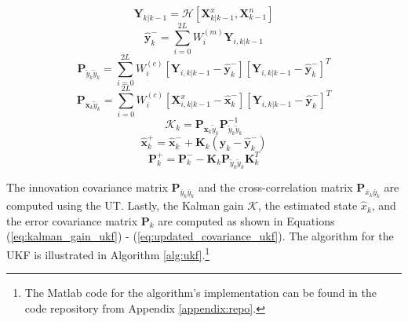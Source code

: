 \begin{equation}
\mathbf{Y}_{k|k-1} = \mathcal{H}\left[\mathbf{X}^x_{k|k-1}, \mathbf{X}^n_{k-1}\right]
\label{eq:predicted_measurement}
\end{equation}
\begin{equation}
\hat{\mathbf{y}}^-_k = \sum_{i=0}^{2L} W^{(m)}_i \mathbf{Y}_{i,k|k-1}
\label{eq:predicted_measurement_estimate}
\end{equation}
\begin{equation}
\mathbf{P}_{\tilde{y}_k\tilde{y}_k} = \sum_{i=0}^{2L} W^{(c)}_i \left[\mathbf{Y}_{i,k|k-1} - \hat{\mathbf{y}}^-_k\right]\left[\mathbf{Y}_{i,k|k-1} - \hat{\mathbf{y}}^-_k\right]^T
\label{eq:innovation_covariance}
\end{equation}
\begin{equation}
\mathbf{P}_{\mathbf{x}_k\tilde{y}_k} = \sum_{i=0}^{2L} W^{(c)}_i \left[\mathbf{X}^x_{i,k|k-1} - \hat{\mathbf{x}}^-_k\right]\left[\mathbf{Y}_{i,k|k-1} - \hat{\mathbf{y}}^-_k\right]^T
\label{eq:cross_covariance}
\end{equation}
\begin{equation}
\mathcal{K}_k = \mathbf{P}_{\mathbf{x}_k\tilde{y}_k} \mathbf{P}_{\tilde{y}_k\tilde{y}_k}^{-1}
\label{eq:kalman_gain_ukf}
\end{equation}
\begin{equation}
\hat{\mathbf{x}}^+_k = \hat{\mathbf{x}}^-_k + \mathbf{K}_k \left(\mathbf{y}_k - \hat{\mathbf{y}}^-_k\right)
\label{eq:updated_state_ukf}
\end{equation}
\begin{equation}
\mathbf{P}^+_k = \mathbf{P}^-_k - \mathbf{K}_k \mathbf{P}_{\tilde{y}_k\tilde{y}_k} \mathbf{K}_k^T
\label{eq:updated_covariance_ukf}
\end{equation}

The innovation covariance matrix \( \mathbf{P}_{\bar{y}_k\bar{y}_k} \) and the cross-correlation matrix \( \mathbf{P}_{\bar{x}_k\bar{y}_k} \) are computed using the \ac{UT}. Lastly, the Kalman gain \( \mathcal{K} \), the estimated state \( \hat{x}_k \), and the error covariance matrix \( \mathbf{P}_k \) are computed as shown in Equations (\ref{eq:kalman_gain_ukf}) - (\ref{eq:updated_covariance_ukf}). The algorithm for the \ac{UKF} is illustrated in Algorithm \ref{alg:ukf}.\footnote{The Matlab code for the algorithm's implementation can be found in the code repository from Appendix \ref{appendix:repo}.}


